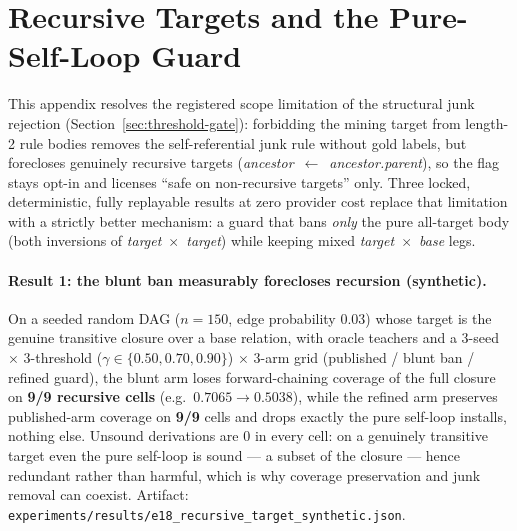 \documentclass[11pt]{article}
\theoremstyle{plain}
\begin{document}
\section{Recursive Targets and the Pure-Self-Loop Guard}
\label{sec:recursive-boundary}

This appendix resolves the registered scope limitation of the structural
junk rejection (Section~\ref{sec:threshold-gate}): forbidding the mining
target from length-2 rule bodies removes the self-referential junk rule
without gold labels, but forecloses genuinely recursive targets
(\emph{ancestor}~$\leftarrow$~\emph{ancestor.parent}), so the flag stays
opt-in and licenses ``safe on non-recursive targets'' only. Three locked,
deterministic, fully replayable results at zero provider cost replace that
limitation with a strictly better mechanism: a guard that bans \emph{only}
the pure all-target body (both inversions of
\emph{target}~$\times$~\emph{target}) while keeping mixed
\emph{target}~$\times$~\emph{base} legs.

\paragraph{Result 1: the blunt ban measurably forecloses recursion (synthetic).}
On a seeded random DAG ($n{=}150$, edge probability $0.03$) whose target is
the genuine transitive closure over a base relation, with oracle teachers
and a $3$-seed $\times$ $3$-threshold ($\gamma \in \{0.50, 0.70, 0.90\}$)
$\times$ $3$-arm grid (published / blunt ban / refined guard), the blunt
arm loses forward-chaining coverage of the full closure on \textbf{9/9
recursive cells} (e.g.\ $0.7065 \rightarrow 0.5038$), while the refined arm
preserves published-arm coverage on \textbf{9/9} cells and drops exactly
the pure self-loop installs, nothing else. Unsound derivations are $0$ in
every cell: on a genuinely transitive target even the pure self-loop is
sound --- a subset of the closure --- hence redundant rather than harmful,
which is why coverage preservation and junk removal can coexist. Artifact:
\texttt{experiments/results/e18\_recursive\_target\_synthetic.json}.
\end{document}
